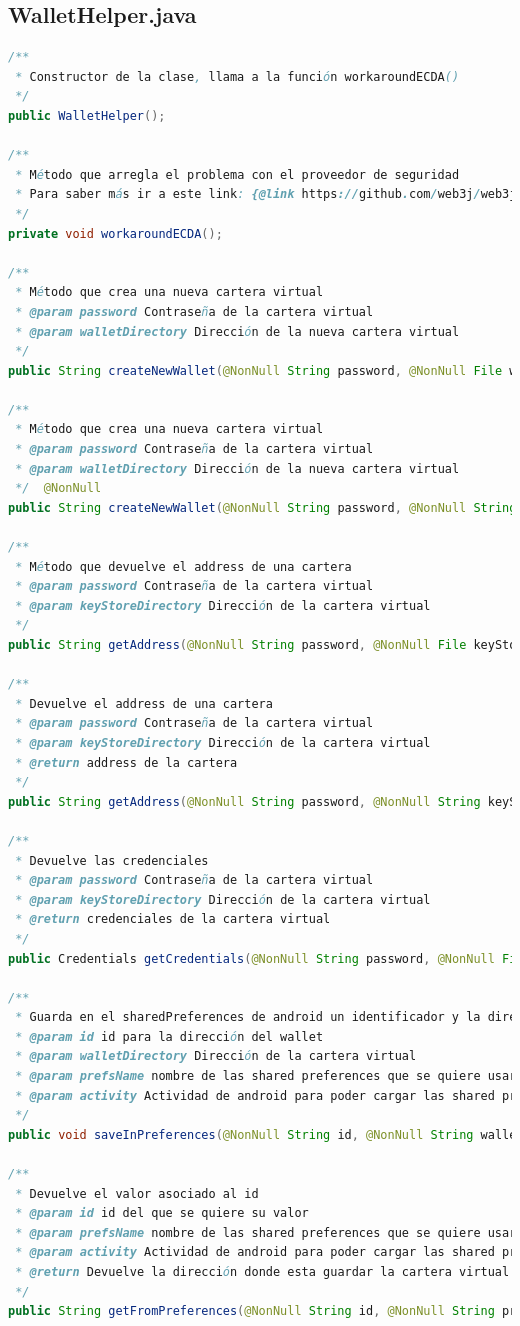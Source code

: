 \subsection{WalletHelper.java}
\begin{lstlisting}[language=Java,caption={[Java] Documentación de WalletHelper},label=lst:transactionHelper]
/**
 * Constructor de la clase, llama a la función workaroundECDA()
 */
public WalletHelper();

/**
 * Método que arregla el problema con el proveedor de seguridad
 * Para saber más ir a este link: {@link https://github.com/web3j/web3j/issues/915}
 */
private void workaroundECDA();

/**
 * Método que crea una nueva cartera virtual
 * @param password Contraseña de la cartera virtual
 * @param walletDirectory Dirección de la nueva cartera virtual
 */
public String createNewWallet(@NonNull String password, @NonNull File walletDirectory);

/**
 * Método que crea una nueva cartera virtual
 * @param password Contraseña de la cartera virtual
 * @param walletDirectory Dirección de la nueva cartera virtual
 */  @NonNull
public String createNewWallet(@NonNull String password, @NonNull String walletDirectory);

/**
 * Método que devuelve el address de una cartera
 * @param password Contraseña de la cartera virtual
 * @param keyStoreDirectory Dirección de la cartera virtual
 */  
public String getAddress(@NonNull String password, @NonNull File keyStoreDirectory);

/**
 * Devuelve el address de una cartera
 * @param password Contraseña de la cartera virtual
 * @param keyStoreDirectory Dirección de la cartera virtual
 * @return address de la cartera
 */ 
public String getAddress(@NonNull String password, @NonNull String keyStoreDirectory);

/**
 * Devuelve las credenciales
 * @param password Contraseña de la cartera virtual
 * @param keyStoreDirectory Dirección de la cartera virtual
 * @return credenciales de la cartera virtual
 */ 
public Credentials getCredentials(@NonNull String password, @NonNull File keyStoreDirectory);

/**
 * Guarda en el sharedPreferences de android un identificador y la dirección del wallet
 * @param id id para la dirección del wallet
 * @param walletDirectory Dirección de la cartera virtual
 * @param prefsName nombre de las shared preferences que se quiere usar
 * @param activity Actividad de android para poder cargar las shared preferences
 */ 
public void saveInPreferences(@NonNull String id, @NonNull String walletDirectory, @NonNull String prefsName, @NonNull Activity activity);

/**
 * Devuelve el valor asociado al id
 * @param id id del que se quiere su valor
 * @param prefsName nombre de las shared preferences que se quiere usar
 * @param activity Actividad de android para poder cargar las shared preferences
 * @return Devuelve la dirección donde esta guardar la cartera virtual de la persona
 */ 
public String getFromPreferences(@NonNull String id, @NonNull String prefsName, @NonNull Activity activity);
\end{lstlisting}

